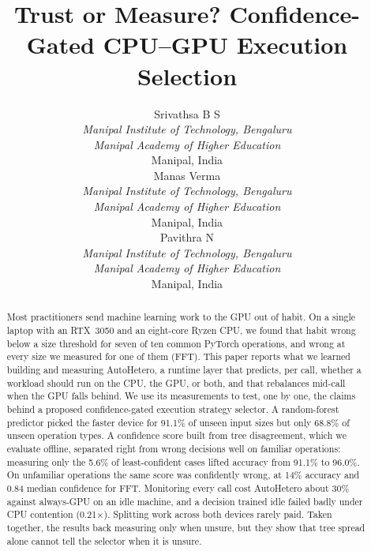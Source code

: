 \documentclass[conference]{IEEEtran}
\begin{document}
\title{Trust or Measure? Confidence-Gated CPU--GPU Execution Selection}

\author{\begin{tabular}[t]{@{}c@{}}Srivathsa B S\\[3pt]\footnotesize\textit{Manipal Institute of Technology, Bengaluru}\\\footnotesize\textit{Manipal Academy of Higher Education}\\\footnotesize Manipal, India\end{tabular}
\hfill
\begin{tabular}[t]{@{}c@{}}Manas Verma\\[3pt]\footnotesize\textit{Manipal Institute of Technology, Bengaluru}\\\footnotesize\textit{Manipal Academy of Higher Education}\\\footnotesize Manipal, India\end{tabular}
\hfill
\begin{tabular}[t]{@{}c@{}}Pavithra N\\[3pt]\footnotesize\textit{Manipal Institute of Technology, Bengaluru}\\\footnotesize\textit{Manipal Academy of Higher Education}\\\footnotesize Manipal, India\end{tabular}}
\maketitle

\begin{abstract}
Most practitioners send machine learning work to the GPU out of habit. On a single laptop with an RTX~3050 and an eight-core Ryzen CPU, we found that habit wrong below a size threshold for seven of ten common PyTorch operations, and wrong at every size we measured for one of them (FFT). This paper reports what we learned building and measuring AutoHetero, a runtime layer that predicts, per call, whether a workload should run on the CPU, the GPU, or both, and that rebalances mid-call when the GPU falls behind. We use its measurements to test, one by one, the claims behind a proposed confidence-gated execution strategy selector. A random-forest predictor picked the faster device for 91.1\% of unseen input sizes but only 68.8\% of unseen operation types. A confidence score built from tree disagreement, which we evaluate offline, separated right from wrong decisions well on familiar operations: measuring only the 5.6\% of least-confident cases lifted accuracy from 91.1\% to 96.0\%. On unfamiliar operations the same score was confidently wrong, at 14\% accuracy and 0.84 median confidence for FFT. Monitoring every call cost AutoHetero about 30\% against always-GPU on an idle machine, and a decision trained idle failed badly under CPU contention (0.21$\times$). Splitting work across both devices rarely paid. Taken together, the results back measuring only when unsure, but they show that tree spread alone cannot tell the selector when it is unsure.
\end{abstract}
\end{document}
